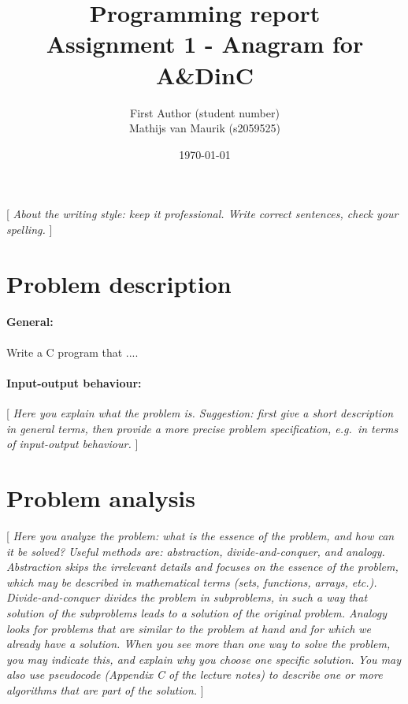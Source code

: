\documentclass[a4paper]{article}
\begin{document}
\title{Programming report \\
       Assignment 1 - Anagram for A\&DinC
}
\date{\today}
\author{First Author (student number) \\
        Mathijs van Maurik (s2059525)
}

\maketitle

[ \textit{About the writing style: keep it professional. 
Write correct sentences, check your spelling.} ]

\section{Problem description}

\paragraph{General:}
Write a C program that ....

\paragraph{Input-output behaviour:}

[ \textit{Here you explain what the problem is. 
Suggestion: first give a short description in general terms, then provide a more precise problem specification, e.g.\ in terms of input-output behaviour.} ]

\section{Problem analysis}

[ \textit{Here you analyze the problem: what is the essence of the problem, and how can it be solved? 
Useful methods are: abstraction, divide-and-conquer, and analogy. 
Abstraction skips the irrelevant details and focuses on the essence of the problem, which may be described in mathematical terms (sets, functions, arrays, etc.).
Divide-and-conquer divides the problem in subproblems, in such a way that solution of the subproblems leads to a solution of the original problem. 
Analogy looks for problems that are similar to the problem at hand and for which we already have a solution. 
When you see more than one way to solve the problem, you may indicate this, and explain why you choose one specific solution. 
You may also use pseudocode (Appendix C of the lecture notes) to describe one or more algorithms that are part of the solution.} ]
\end{document}
